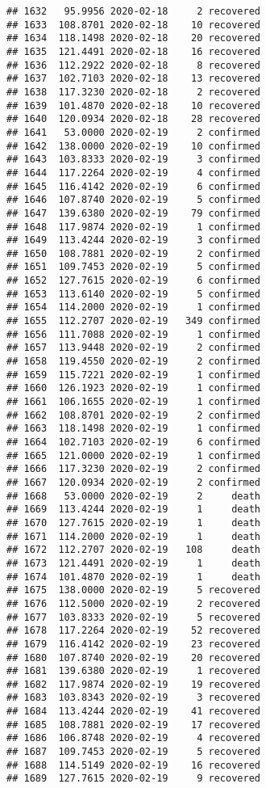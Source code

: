 \documentclass[
]{article}
\begin{document}
\begin{verbatim}
## 1632   95.9956 2020-02-18     2 recovered
## 1633  108.8701 2020-02-18    10 recovered
## 1634  118.1498 2020-02-18    20 recovered
## 1635  121.4491 2020-02-18    16 recovered
## 1636  112.2922 2020-02-18     8 recovered
## 1637  102.7103 2020-02-18    13 recovered
## 1638  117.3230 2020-02-18     2 recovered
## 1639  101.4870 2020-02-18    10 recovered
## 1640  120.0934 2020-02-18    28 recovered
## 1641   53.0000 2020-02-19     2 confirmed
## 1642  138.0000 2020-02-19    10 confirmed
## 1643  103.8333 2020-02-19     3 confirmed
## 1644  117.2264 2020-02-19     4 confirmed
## 1645  116.4142 2020-02-19     6 confirmed
## 1646  107.8740 2020-02-19     5 confirmed
## 1647  139.6380 2020-02-19    79 confirmed
## 1648  117.9874 2020-02-19     1 confirmed
## 1649  113.4244 2020-02-19     3 confirmed
## 1650  108.7881 2020-02-19     2 confirmed
## 1651  109.7453 2020-02-19     5 confirmed
## 1652  127.7615 2020-02-19     6 confirmed
## 1653  113.6140 2020-02-19     5 confirmed
## 1654  114.2000 2020-02-19     1 confirmed
## 1655  112.2707 2020-02-19   349 confirmed
## 1656  111.7088 2020-02-19     1 confirmed
## 1657  113.9448 2020-02-19     2 confirmed
## 1658  119.4550 2020-02-19     2 confirmed
## 1659  115.7221 2020-02-19     1 confirmed
## 1660  126.1923 2020-02-19     1 confirmed
## 1661  106.1655 2020-02-19     1 confirmed
## 1662  108.8701 2020-02-19     2 confirmed
## 1663  118.1498 2020-02-19     1 confirmed
## 1664  102.7103 2020-02-19     6 confirmed
## 1665  121.0000 2020-02-19     1 confirmed
## 1666  117.3230 2020-02-19     2 confirmed
## 1667  120.0934 2020-02-19     2 confirmed
## 1668   53.0000 2020-02-19     2     death
## 1669  113.4244 2020-02-19     1     death
## 1670  127.7615 2020-02-19     1     death
## 1671  114.2000 2020-02-19     1     death
## 1672  112.2707 2020-02-19   108     death
## 1673  121.4491 2020-02-19     1     death
## 1674  101.4870 2020-02-19     1     death
## 1675  138.0000 2020-02-19     5 recovered
## 1676  112.5000 2020-02-19     2 recovered
## 1677  103.8333 2020-02-19     5 recovered
## 1678  117.2264 2020-02-19    52 recovered
## 1679  116.4142 2020-02-19    23 recovered
## 1680  107.8740 2020-02-19    20 recovered
## 1681  139.6380 2020-02-19     1 recovered
## 1682  117.9874 2020-02-19    19 recovered
## 1683  103.8343 2020-02-19     3 recovered
## 1684  113.4244 2020-02-19    41 recovered
## 1685  108.7881 2020-02-19    17 recovered
## 1686  106.8748 2020-02-19     4 recovered
## 1687  109.7453 2020-02-19     5 recovered
## 1688  114.5149 2020-02-19    16 recovered
## 1689  127.7615 2020-02-19     9 recovered

\end{verbatim}
\end{document}
